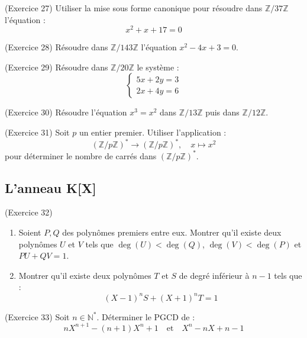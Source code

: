 \begin{exercice}
(Exercice 27)
Utiliser la mise sous forme canonique pour résoudre dans $\mathbb{Z}/37\mathbb{Z}$ l'équation :
$$ x^{2}+x+17=0 $$ 
\end{exercice}

\begin{exercice}
(Exercice 28)
Résoudre dans $\mathbb{Z}/143\mathbb{Z}$ l'équation $x^{2}-4x+3=0$. 
\end{exercice}

\begin{exercice}
(Exercice 29)
Résoudre dans $\mathbb{Z}/20\mathbb{Z}$ le système :
$$ \begin{cases}5x+2y=3\\ 2x+4y=6\end{cases} $$ 
\end{exercice}

\begin{exercice}
(Exercice 30)
Résoudre l'équation $x^{3}=x^{2}$ dans $\mathbb{Z}/13\mathbb{Z}$ puis dans $\mathbb{Z}/12\mathbb{Z}$. 
\end{exercice}

\begin{exercice}
(Exercice 31)
Soit $p$ un entier premier. Utiliser l'application :
$$ (\mathbb{Z}/p\mathbb{Z})^{*}\rightarrow(\mathbb{Z}/p\mathbb{Z})^{*}, \quad x \mapsto x^2 $$ 
pour déterminer le nombre de carrés dans $(\mathbb{Z}/p\mathbb{Z})^{*}$. 
\end{exercice}

\subsection{L'anneau K[X]}

\begin{exercice}
(Exercice 32)
\begin{enumerate}
 \item[a)] Soient $P, Q$ des polynômes premiers entre eux. Montrer qu'il existe deux polynômes $U$ et $V$ tels que $\deg(U)<\deg(Q)$, $\deg(V)<\deg(P)$ et $PU+QV=1$. 
 \item[b)] Montrer qu'il existe deux polynômes $T$ et $S$ de degré inférieur à $n-1$ tels que :
 $$ (X-1)^{n}S+(X+1)^{n}T=1 $$ 
\end{enumerate}
\end{exercice}

\begin{exercice}
(Exercice 33)
Soit $n\in\mathbb{N}^{*}$. Déterminer le PGCD de :
$$ nX^{n+1}-(n+1)X^{n}+1 \quad \text{et} \quad X^{n}-nX+n-1 $$ 
\end{exercice}

